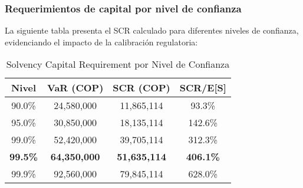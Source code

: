 \subsubsection{Requerimientos de capital por nivel de confianza}

La siguiente tabla presenta el SCR calculado para diferentes niveles de confianza, evidenciando el impacto de la calibración regulatoria:

\begin{table}[H]
\centering
\caption{Solvency Capital Requirement por Nivel de Confianza}
\begin{tabular}{cccc}
\hline
\textbf{Nivel} & \textbf{VaR (COP)} & \textbf{SCR (COP)} & \textbf{SCR/E[S]} \\
\hline
90.0\% & 24,580,000 & 11,865,114 & 93.3\% \\
95.0\% & 30,850,000 & 18,135,114 & 142.6\% \\
99.0\% & 52,420,000 & 39,705,114 & 312.3\% \\
\textbf{99.5\%} & \textbf{64,350,000} & \textbf{51,635,114} & \textbf{406.1\%} \\
99.9\% & 92,560,000 & 79,845,114 & 628.0\% \\
\hline
\end{tabular}
\end{table}